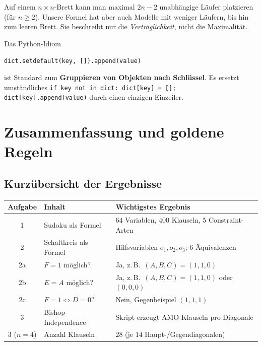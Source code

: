\documentclass[a4paper,12pt]{article}
\begin{document}
\begin{merkbox}[title={Maximale L\"aufer-Anzahl}]
Auf einem $n \times n$-Brett kann man maximal $2n - 2$ unabh\"angige
L\"aufer platzieren (f\"ur $n \ge 2$). Unsere Formel hat aber auch
Modelle mit weniger L\"aufern, bis hin zum leeren Brett. Sie
beschreibt nur die \emph{Vertr\"aglichkeit}, nicht die Maximalit\"at.
\end{merkbox}

\begin{merkbox}[title={Pattern zum Mitnehmen}]
Das Python-Idiom
\begin{center}
\texttt{dict.setdefault(key, []).append(value)}
\end{center}
ist Standard zum \textbf{Gruppieren von Objekten nach Schl\"ussel}.
Es ersetzt umst\"andliches \texttt{if key not in dict: dict[key] = [];
dict[key].append(value)} durch einen einzigen Einzeiler.
\end{merkbox}

\newpage


\section*{Zusammenfassung und goldene Regeln}

\subsection*{Kurz\"ubersicht der Ergebnisse}

\begin{center}
\renewcommand{\arraystretch}{1.4}
\begin{tabular}{c|l|l}
\toprule
\textbf{Aufgabe} & \textbf{Inhalt} & \textbf{Wichtigstes Ergebnis} \\
\midrule
1 & Sudoku als Formel & $64$ Variablen, $400$ Klauseln, $5$ Constraint-Arten \\
2 & Schaltkreis als Formel & Hilfsvariablen $o_1, o_2, o_3$; 6 \"Aquivalenzen \\
2a & $F = 1$ m\"oglich? & Ja, z.\,B.\ $(A,B,C) = (1,1,0)$ \\
2b & $E = A$ m\"oglich? & Ja, z.\,B.\ $(A,B,C) = (1,1,0)$ oder $(0,0,0)$ \\
2c & $F = 1 \Leftrightarrow D = 0$? & Nein, Gegenbeispiel $(1,1,1)$ \\
3 & Bishop Independence & Skript erzeugt AMO-Klauseln pro Diagonale \\
3 ($n=4$) & Anzahl Klauseln & $28$ (je $14$ Haupt-/Gegendiagonalen) \\
\bottomrule
\end{tabular}
\end{center}
\end{document}
